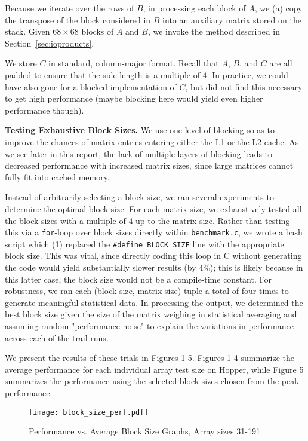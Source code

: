 \documentclass{article} %
\begin{document}
Because we iterate over the rows of $B$, in processing
each block of $A$, we (a) copy the transpose of the block considered in $B$ into
an auxiliary matrix stored on the stack. Given $68\times 68$ blocks of $A$ and
$B$, we invoke the method described in Section~\ref{sec:ioproducts}.

We store $C$ in standard, column-major format. Recall that $A$, $B$, and $C$
are all padded to ensure that the side length is a multiple of $4$. In practice,
we could have also gone for a blocked implementation of $C$, but did not find
this necessary to get high performance (maybe blocking here would yield even
higher performance though).

\textbf{Testing Exhaustive Block Sizes.} We use one level
of blocking so as to improve the chances of matrix entries entering either the
L1 or the L2 cache. As we see later in this report, the lack of multiple layers
of blocking leads to decreased performance with increased matrix sizes, since
large matrices cannot fully fit into cached memory.

Instead of arbitrarily selecting a block size, we ran several experiments to
determine the optimal block size. For each matrix size, we exhaustively tested all the block sizes with a multiple of $4$ up
to the matrix size. Rather than testing this via a \texttt{for}-loop over block sizes
directly within \texttt{benchmark.c}, we wrote a bash script which (1) replaced the
\texttt{\#define BLOCK\_SIZE} line with the appropriate block size. This was vital,
since directly coding this loop in C without generating the code would yield
substantially slower results (by 4\%); this is likely because in this latter case,
the block size would not be a compile-time constant. For robustness, we ran each
(block size, matrix size) tuple a total of four times to generate meaningful statistical data. In processing the output, we determined the best block size given the size of the matrix weighing in statistical averaging and assuming random "performance noise" to explain the variations in performance across each of the trail runs.

We present the results of these trials in Figures 1-5. Figures 1-4 summarize the
average performance for each individual array test size on Hopper, while Figure 5 summarizes
the performance using the selected block sizes chosen from the peak performance.

\begin{figure}
 \noindent
 \hspace*{-1.5in}
 \texttt{[image: block\_size\_perf.pdf]}
 \caption{Performance vs. Average Block Size Graphs, Array sizes 31-191}
\end{figure}
\end{document}
